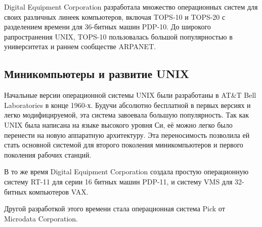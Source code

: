 Digital Equipment Corporation разработала множество операционных систем для своих различных линеек компьютеров, включая TOPS-10 и TOPS-20 с разделением времени для 36-битных машин PDP-10. До широкого рапространения UNIX, TOPS-10 пользовалась большой популярностью в университетах и раннем сообществе ARPANET.

\subsection{Миникомпьютеры и развитие UNIX}\label{base:os:history:unix}
Начальные версии операционной системы UNIX были разработаны в AT\&T Bell Laboratories в конце 1960-х. Будучи абсолютно бесплатной в первых версиях и легко модифицируемой, эта система завоевала большую популярность. Так как UNIX была написана на языке высокого уровня Си, её можно легко было перенести на новую аппаратную архитектуру. Эта переносимость позволила ей стать основной системой для второго поколения миникомпьютеров и первого поколения рабочих станций.

В то же время Digital Equipment Corporation создала простую операционную систему RT-11 для серии 16 битных машин PDP-11, и систему VMS для 32-битных компьютеров VAX.

Другой разработкой этого времени стала операционная система Pick от Microdata Corporation.